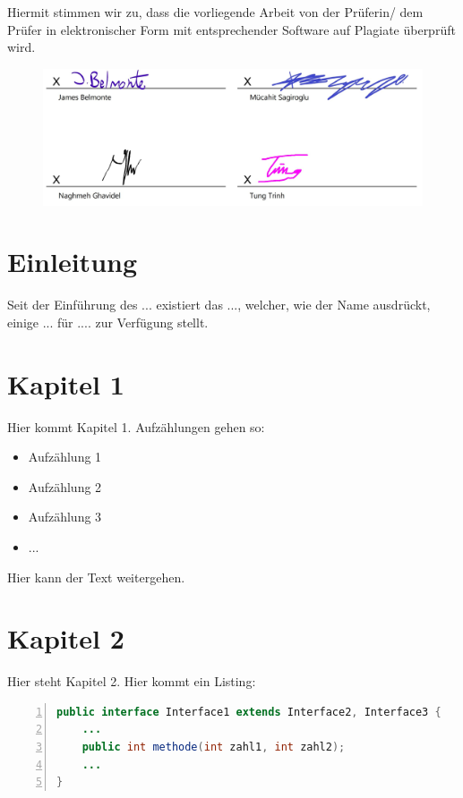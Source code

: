 \documentclass[fontsize=12pt,paper=a4,open=any,parskip=half,
  twoside=false,toc=listof,toc=bibliography,fleqn,leqno,
  captions=nooneline,captions=tableabove,british]{scrbook}
\begin{document}
Hiermit stimmen wir zu, dass die vorliegende Arbeit von der Prüferin/ dem Prüfer in elektronischer Form
mit entsprechender Software auf Plagiate überprüft wird.

\begin{figure}[H]
	\centering
	\includegraphics[width=1\linewidth]{Bilder/unterschrift}
\end{figure}

\tableofcontents
\listoffigures
\listoftables
\lstlistoflistings

\mainmatter %



\chapter{Einleitung}\label{ch:intro}
Seit der Einführung des ... existiert das ..., welcher, wie der Name ausdrückt, einige ... für .... zur Verfügung stellt.

\chapter{Kapitel 1}\label{ch:j.u}
Hier kommt Kapitel 1. Aufzählungen gehen so:
\begin{itemize}
 \item Aufzählung 1
 \item Aufzählung 2
 \item Aufzählung 3
 \item ...
\end{itemize}
Hier kann der Text weitergehen.

\chapter{Kapitel 2}\label{ch:interfaces}
Hier steht Kapitel 2. Hier kommt ein Listing:
\begin{lstlisting}[language=Java,
					caption={Deklaration eines Interfaces},
					backgroundcolor = \color{lightgray},
					captionpos=b,
					numbers=left,
					keywordstyle=\color{RoyalBlue},
    				rulecolor=\color{black},
   		 			upquote=true, 
					showstringspaces=false,
    				breaklines=true,
    				frame=single,
					aboveskip=2em,
					label={interface-deklaration},
]
public interface Interface1 extends Interface2, Interface3 {
	...
	public int methode(int zahl1, int zahl2);
	...
}
\end{lstlisting}
\captionsetup{justification=centering,margin=2cm}
\end{document}
